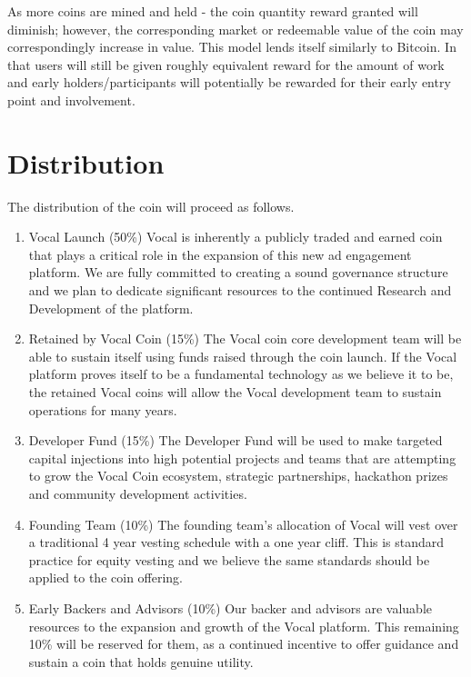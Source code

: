 \documentclass[conference]{IEEEtran}
\begin{document}
     As more coins are mined and held - the coin quantity reward granted will diminish; however, the corresponding market or redeemable value of the coin may correspondingly increase in value. This model lends itself similarly to Bitcoin. In that users
     will still be given roughly equivalent reward for the amount of work and early holders/participants will potentially be rewarded for their early entry point and involvement.

    \section{Distribution}

    The distribution of the coin will proceed as follows.

    \begin{enumerate}
    \item Vocal Launch (50\%)
   Vocal is inherently a publicly traded and earned coin that plays a critical role in the expansion of this new ad engagement platform. We are fully committed to creating a sound governance structure and we plan to dedicate significant resources to the continued Research and Development of the platform.
    \item Retained by Vocal Coin (15\%)
    The Vocal coin core development team will be able to sustain itself using funds raised through the coin launch. If the Vocal platform proves itself to be a fundamental technology as we believe it to be, the retained Vocal coins will allow the Vocal development team to sustain operations for many years.
    \item Developer Fund (15\%)
    The Developer Fund will be used to make targeted capital injections into high potential projects and teams that are attempting to grow the Vocal Coin ecosystem, strategic partnerships, hackathon prizes and community development activities.
    \item Founding Team (10\%)
    The founding team’s allocation of Vocal will vest over a traditional 4 year vesting schedule with a one year cliff. This is standard practice for equity vesting and we believe the same standards should be applied to the coin offering. 
    \item Early Backers and Advisors (10\%)
    Our backer and advisors are valuable resources to the expansion and growth of the Vocal platform. This remaining 10\% will be reserved for them, as a continued incentive to offer guidance and sustain a coin that holds genuine utility.
    \end{enumerate}
    
\end{document}
